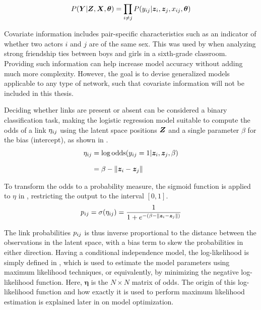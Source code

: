     \begin{equation}\label{eq:lsm-model}
        P(\Y|\Z,\X,\bm{\theta}) = \prod_{i\neq j} P(\sub(y)|\z_i,\z_j,\sub(x),\bm{\theta})
    \end{equation}
    
    Covariate information includes pair-specific characteristics such as an indicator of whether two actors $i$ and $j$ are of the same sex. This was used by \citeauthor*{hoff2002latent} when analyzing strong friendship ties between boys and girls in a sixth-grade classroom. Providing such information can help increase model accuracy without adding much more complexity. However, the goal is to devise generalized models applicable to any type of network, such that covariate information will not be included in this thesis. 
    
    Deciding whether links are present or absent can be considered a binary classification task, making the logistic regression model suitable to compute the odds of a link $\sub(\eta)$ using the latent space positions $\bm{Z}$ and a single parameter $\beta$ for the bias (intercept), as shown in .
    \begin{equation}\label{eq:lsm-odds}
        \begin{split}
            \sub(\eta) &= \log \odds(\sub(y)=1|\z_i,\z_j,\beta) \\[0.5\baselineskip]
                       &= \beta - \Vert\z_i-\z_j\Vert
        \end{split}
    \end{equation}
    
    To transform the odds to a probability measure, the sigmoid function is applied to $\eta$ in , restricting the output to the interval $[0,1]$.
    \begin{equation}\label{eq:lsm-proba}
        \sub(p) = \sigma(\sub(\eta)) = \frac{1}{1 + e^{-(\beta - \Vert\z_i-\z_j\Vert)}}
    \end{equation}
    
    The link probabilities $\sub(p)$ is thus inverse proportional to the distance between the observations in the latent space, with a bias term to skew the probabilities in either direction.
    Having a conditional independence model, the log-likelihood is simply defined in , which is used to estimate the model parameters using maximum likelihood techniques, or equivalently, by minimizing the negative log-likelihood function. Here, $\bm{\eta}$ is the $N\times N$ matrix of odds. The origin of this log-likelihood function and how exactly it is used to perform maximum likelihood estimation is explained later in  on model optimization.
    
